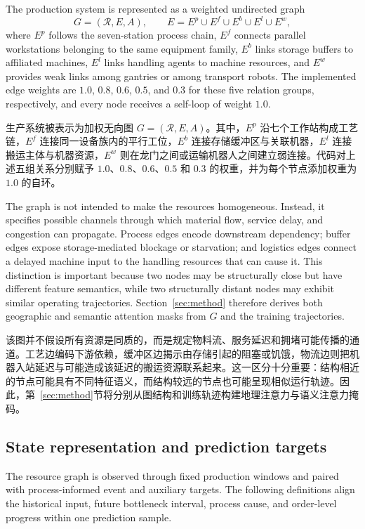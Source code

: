 \documentclass[a4paper,fleqn]{cas-dc}
\newcommand{\zhpara}[1]{%
  \par\begingroup\small\color{black!72}\noindent #1\par\endgroup}
\begin{document}
The production system is represented as a weighted undirected graph
\begin{equation}
G=(\mathcal{R},E,A),\qquad
E=E^{p}\cup E^{f}\cup E^{b}\cup E^{l}\cup E^{w},
\end{equation}
where $E^{p}$ follows the seven-station process chain, $E^{f}$ connects parallel workstations belonging to the same equipment family, $E^{b}$ links storage buffers to affiliated machines, $E^{l}$ links handling agents to machine resources, and $E^{w}$ provides weak links among gantries or among transport robots. The implemented edge weights are $1.0$, $0.8$, $0.6$, $0.5$, and $0.3$ for these five relation groups, respectively, and every node receives a self-loop of weight $1.0$.

\zhpara{生产系统被表示为加权无向图 $G=(\mathcal{R},E,A)$。其中，$E^{p}$ 沿七个工作站构成工艺链，$E^{f}$ 连接同一设备族内的平行工位，$E^{b}$ 连接存储缓冲区与关联机器，$E^{l}$ 连接搬运主体与机器资源，$E^{w}$ 则在龙门之间或运输机器人之间建立弱连接。代码对上述五组关系分别赋予 $1.0$、$0.8$、$0.6$、$0.5$ 和 $0.3$ 的权重，并为每个节点添加权重为 $1.0$ 的自环。}

The graph is not intended to make the resources homogeneous. Instead, it specifies possible channels through which material flow, service delay, and congestion can propagate. Process edges encode downstream dependency; buffer edges expose storage-mediated blockage or starvation; and logistics edges connect a delayed machine input to the handling resources that can cause it. This distinction is important because two nodes may be structurally close but have different feature semantics, while two structurally distant nodes may exhibit similar operating trajectories. Section~\ref{sec:method} therefore derives both geographic and semantic attention masks from $G$ and the training trajectories.

\zhpara{该图并不假设所有资源是同质的，而是规定物料流、服务延迟和拥堵可能传播的通道。工艺边编码下游依赖，缓冲区边揭示由存储引起的阻塞或饥饿，物流边则把机器入站延迟与可能造成该延迟的搬运资源联系起来。这一区分十分重要：结构相近的节点可能具有不同特征语义，而结构较远的节点也可能呈现相似运行轨迹。因此，第~\ref{sec:method}节将分别从图结构和训练轨迹构建地理注意力与语义注意力掩码。}

\subsection{State representation and prediction targets}

The resource graph is observed through fixed production windows and paired with process-informed event and auxiliary targets. The following definitions align the historical input, future bottleneck interval, process cause, and order-level progress within one prediction sample.
\end{document}
